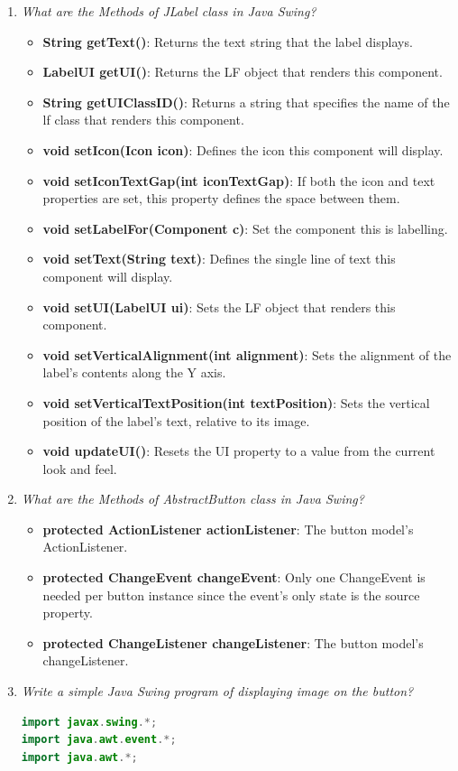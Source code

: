 \documentclass[11pt]{article}
\begin{document}
\begin{enumerate}
	\item \textit{What are the Methods of JLabel class in Java Swing?}
	      \begin{itemize}
		      \item \textbf{String getText()}: Returns the text string that the label displays.
		      \item \textbf{LabelUI getUI()}: Returns the LF object that renders this component.
		      \item \textbf{String getUIClassID()}: Returns a string that specifies the name of the lf class that renders this component.
		      \item \textbf{void setIcon(Icon icon)}: Defines the icon this component will display.
		      \item \textbf{void setIconTextGap(int iconTextGap)}: If both the icon and text properties are set, this property defines the space between them.
		      \item \textbf{void setLabelFor(Component c)}: Set the component this is labelling.
		      \item \textbf{void setText(String text)}: Defines the single line of text this component will display.
		      \item \textbf{void setUI(LabelUI ui)}: Sets the LF object that renders this component.
		      \item \textbf{void setVerticalAlignment(int alignment)}: Sets the alignment of the label's contents along the Y axis.
		      \item \textbf{void setVerticalTextPosition(int textPosition)}: Sets the vertical position of the label's text, relative to its image.
		      \item \textbf{void updateUI()}: Resets the UI property to a value from the current look and feel.
	      \end{itemize}
	\item \textit{What are the Methods of AbstractButton class in Java Swing?}
	\begin{itemize}
		\item \textbf{protected ActionListener actionListener}: The button model's ActionListener.
		\item \textbf{protected ChangeEvent changeEvent}: Only one ChangeEvent is needed per button instance since the event's only state is the source property.
		\item \textbf{protected ChangeListener changeListener}: The button model's changeListener.
	\end{itemize}
	\item \textit{Write a simple Java Swing program of displaying image on the button?}
	      \begin{lstlisting}[language=Java]
import javax.swing.*;
import java.awt.event.*;
import java.awt.*;


\end{lstlisting}
\end{enumerate}
\end{document}
